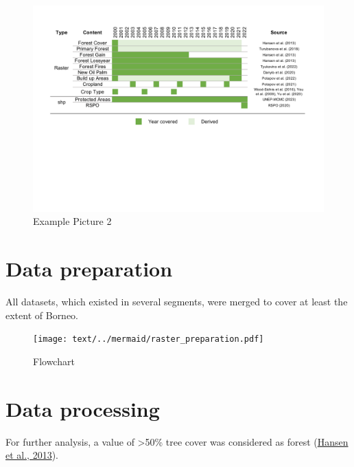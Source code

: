 \documentclass[
  letterpaper,
  DIV=11,
  numbers=noendperiod]{scrreprt}
\begin{document}
\begin{figure}

{\centering \includegraphics{text/05_method_files/data_overview.pdf}

}

\caption{\label{fig-data_overview}Example Picture 2}

\end{figure}

\hypertarget{data-preparation}{%
\section{Data preparation}\label{data-preparation}}

All datasets, which existed in several segments, were merged to cover at
least the extent of Borneo.

\begin{figure}

{\centering \texttt{[image: text/../mermaid/raster\_preparation.pdf]}

}

\caption{\label{fig-mermaid}Flowchart}

\end{figure}

\hypertarget{data-processing}{%
\section{Data processing}\label{data-processing}}

For further analysis, a value of \textgreater50\% tree cover was
considered as forest
(\protect\hyperlink{ref-hansenHighResolutionGlobalMaps2013}{Hansen et
al., 2013}).
\end{document}
